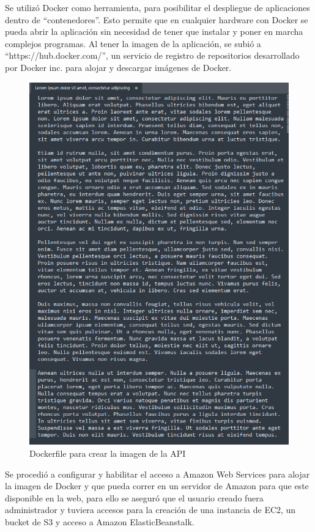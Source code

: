 \documentclass[12pt, a4paper, titlepage]{report}
\begin{document}
Se utilizó Docker como herramienta, para posibilitar el despliegue de aplicaciones dentro de ``contenedores''. Esto permite que en cualquier hardware con Docker se pueda abrir la aplicación sin necesidad de tener que instalar y poner en marcha complejos programas. Al tener la imagen de la aplicación, se subió a  ``https://hub.docker.com/'', un servicio de registro de repositorios desarrollado por Docker inc. para alojar y descargar imágenes de Docker.

\begin{figure}[H]
	\includegraphics[width=12cm]{./imagenes/Desarrollo/AplicacionWeb/Archivo.png}
	\centering 
	\caption{Dockerfile para crear la imagen de la API}
\end{figure}

Se procedió a configurar y habilitar el acceso a Amazon Web Services para alojar la imagen de Docker y que pueda correr en un servidor de Amazon para que este disponible en la web, para ello se aseguró que el usuario creado fuera administrador y tuviera accesos para la creación de una instancia de EC2, un bucket de S3 y acceso a Amazon ElasticBeanstalk.
\end{document}
